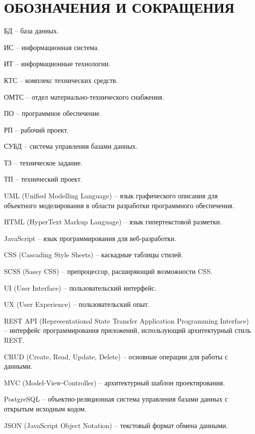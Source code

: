 \section*{ОБОЗНАЧЕНИЯ И СОКРАЩЕНИЯ}

БД -- база данных.

ИС -- информационная система.

ИТ -- информационные технологии. 

КТС -- комплекс технических средств.

ОМТС -- отдел материально-технического снабжения. 

ПО -- программное обеспечение.

РП -- рабочий проект.

СУБД -- система управления базами данных.

ТЗ -- техническое задание.

ТП -- технический проект.

UML (Unified Modelling Language) -- язык графического описания для объектного моделирования в области разработки программного обеспечения.

HTML (HyperText Markup Language) -- язык гипертекстовой разметки.

JavaScript -- язык программирования для веб-разработки.

CSS (Cascading Style Sheets) -- каскадные таблицы стилей.

SCSS (Sassy CSS) -- препроцессор, расширяющий возможности CSS.

UI (User Interface) -- пользовательский интерфейс.

UX (User Experience) -- пользовательский опыт.

REST API (Representational State Transfer Application Programming Interface) -- интерфейс программирования приложений, использующий архитектурный стиль REST.

CRUD (Create, Read, Update, Delete) -- основные операции для работы с данными.

MVC (Model-View-Controller) -- архитектурный шаблон проектирования.

PostgreSQL -- объектно-реляционная система управления базами данных с открытым исходным кодом.

JSON (JavaScript Object Notation) -- текстовый формат обмена данными.